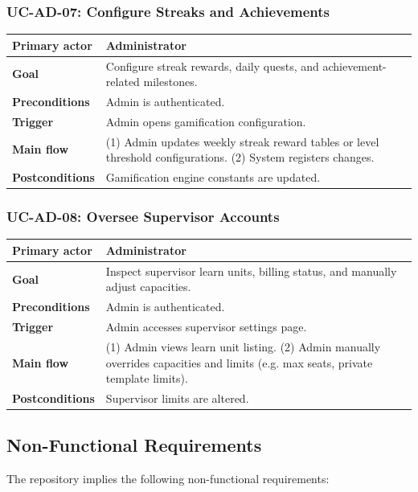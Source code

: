\subsubsection{UC-AD-07: Configure Streaks and Achievements}
\begin{longtable}{L{0.28\textwidth}L{0.62\textwidth}}
\textbf{Primary actor} & Administrator \\ \hline
\textbf{Goal} & Configure streak rewards, daily quests, and achievement-related milestones. \\ \hline
\textbf{Preconditions} & Admin is authenticated. \\ \hline
\textbf{Trigger} & Admin opens gamification configuration. \\ \hline
\textbf{Main flow} & (1) Admin updates weekly streak reward tables or level threshold configurations. (2) System registers changes. \\ \hline
\textbf{Postconditions} & Gamification engine constants are updated. \\
\end{longtable}

\subsubsection{UC-AD-08: Oversee Supervisor Accounts}
\begin{longtable}{L{0.28\textwidth}L{0.62\textwidth}}
\textbf{Primary actor} & Administrator \\ \hline
\textbf{Goal} & Inspect supervisor learn units, billing status, and manually adjust capacities. \\ \hline
\textbf{Preconditions} & Admin is authenticated. \\ \hline
\textbf{Trigger} & Admin accesses supervisor settings page. \\ \hline
\textbf{Main flow} & (1) Admin views learn unit listing. (2) Admin manually overrides capacities and limits (e.g. max seats, private template limits). \\ \hline
\textbf{Postconditions} & Supervisor limits are altered. \\
\end{longtable}

\subsection{Non-Functional Requirements}

The repository implies the following non-functional requirements:

